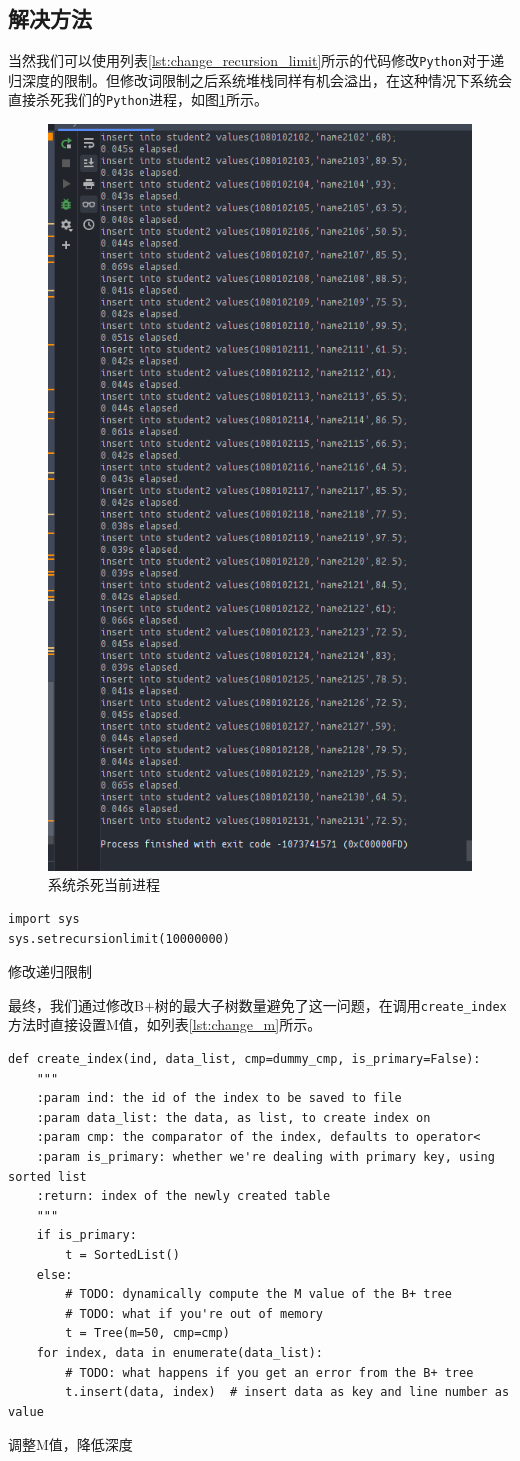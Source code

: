 \documentclass[UTF8]{ctexrep} %
\newenvironment{longlisting}{\captionsetup{type=listing}}{}
\begin{document}
\subsection{解决方法}
当然我们可以使用列表\ref{lst:change_recursion_limit}所示的代码修改\texttt{Python}对于递归深度的限制。但修改词限制之后系统堆栈同样有机会溢出，在这种情况下系统会直接杀死我们的\texttt{Python}进程，如图\ref{fig:kill_process}所示。

\begin{figure}[H]
    \centering
    \includegraphics[width=0.4\linewidth]{figure/system_termination.png}
    \caption{系统杀死当前进程}
    \label{fig:kill_process}
\end{figure}

\begin{longlisting}
    \begin{verbatim}
import sys
sys.setrecursionlimit(10000000)
    \end{verbatim}
    \caption{修改递归限制}
    \label{lst:change_recursion_limit}
\end{longlisting}
最终，我们通过修改B+树的最大子树数量避免了这一问题，在调用\texttt{create\_index}方法时直接设置M值，如列表\ref{lst:change_m}所示。

\begin{longlisting}
    \begin{verbatim}
def create_index(ind, data_list, cmp=dummy_cmp, is_primary=False):
    """
    :param ind: the id of the index to be saved to file
    :param data_list: the data, as list, to create index on
    :param cmp: the comparator of the index, defaults to operator<
    :param is_primary: whether we're dealing with primary key, using sorted list
    :return: index of the newly created table
    """
    if is_primary:
        t = SortedList()
    else:
        # TODO: dynamically compute the M value of the B+ tree
        # TODO: what if you're out of memory
        t = Tree(m=50, cmp=cmp)
    for index, data in enumerate(data_list):
        # TODO: what happens if you get an error from the B+ tree
        t.insert(data, index)  # insert data as key and line number as value
    \end{verbatim}
    \caption{调整M值，降低深度}
    \label{lst:change_m}
\end{longlisting}
\end{document}
